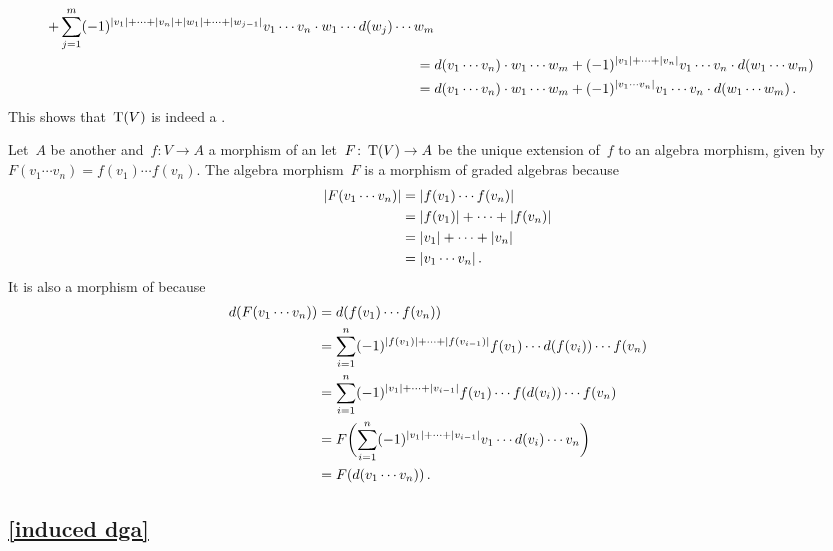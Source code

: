 \begin{enumerate}[start=2]
\begin{gather*}
\begin{aligned}
        +
        \sum_{j=1}^m
        (-1)^{\lvert v_1\rvert + \dotsb + \lvert v_n\rvert + \lvert w_1\rvert + \dotsb + \lvert w_{j-1}\rvert}
        v_1 \dotsm v_n \cdot w_1 \dotsm d(w_j) \dotsm w_m
        \\
        ={}&
        d(v_1 \dotsm v_n) \cdot w_1 \dotsm w_m
        +
        (-1)^{\lvert v_1\rvert + \dotsb + \lvert v_n\rvert}
        v_1 \dotsm v_n \cdot d(w_1 \dotsm w_m)
        \\
        ={}&
        d(v_1 \dotsm v_n) \cdot w_1 \dotsm w_m
        +
        (-1)^{\lvert v_1 \dotsm v_n\rvert}
        v_1 \dotsm v_n \cdot d(w_1 \dotsm w_m) \,.
      \end{aligned}
    \end{gather*}
    This shows that~$\operatorname{T}(V)$ is indeed a {\dga}.
    
    Let~$A$ be another {\dga} and~$f \colon V \to A$ a morphism of {\dgvs} an let~$F \colon \operatorname{T}(V) \to A$ be the unique extension of~$f$ to an algebra morphism, given by~$F(v_1 \dotsm v_n) = f(v_1) \dotsm f(v_n)$.
    The algebra morphism~$F$ is a morphism of graded algebras because
    \begin{align*}
      \lvert F(v_1 \dotsm v_n)\rvert
      &=
      \lvert f(v_1) \dotsm f(v_n)\rvert
      \\
      &=
      \lvert f(v_1)\rvert + \dotsb + \lvert f(v_n)\rvert
      \\
      &=
      \lvert v_1\rvert + \dotsb + \lvert v_n\rvert
      \\
      &=
      \lvert v_1 \dotsm v_n\rvert \,.
    \end{align*}
    It is also a morphism of {\dgvs} because
    \begin{align*}
      d(F(v_1 \dotsm v_n))
      &=
      d( f(v_1) \dotsm f(v_n) )
      \\
      &=
      \sum_{i=1}^n
      (-1)^{\lvert f(v_1)\rvert + \dotsb + \lvert f(v_{i-1})\rvert }
      f(v_1) \dotsm d(f(v_i)) \dotsm f(v_n)
      \\
      &=
      \sum_{i=1}^n
      (-1)^{\lvert v_1\rvert + \dotsb + \lvert v_{i-1}\rvert }
      f(v_1) \dotsm f(d(v_i)) \dotsm f(v_n)
      \\
      &=
      F\biggl(
        \sum_{i=1}^n
        (-1)^{\lvert v_1\rvert + \dotsb + \lvert v_{i-1}\rvert }
        v_1 \dotsm d(v_i) \dotsm v_n
      \biggr)
      \\
      &=
      F(d(v_1 \dotsm v_n)) \,.
    \end{align*}

\end{enumerate}


\subsection{\cref{induced dga}}
\label{induced dga proof}

